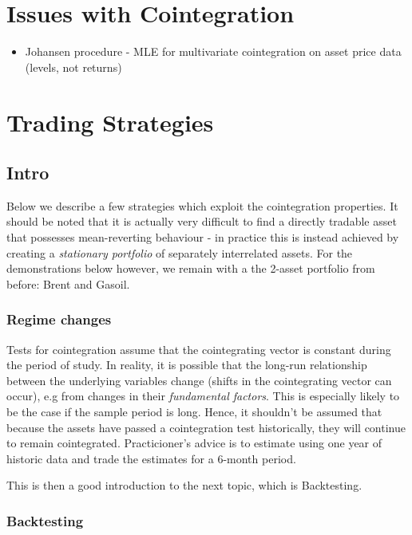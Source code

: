 \documentclass{article}
\providecommand{\tightlist}{%
      \setlength{\itemsep}{0pt}\setlength{\parskip}{0pt}}
\begin{document}
    \section{Issues with Cointegration}\label{issues-with-cointegration}

\begin{itemize}
\tightlist
\item
  Johansen procedure - MLE for multivariate cointegration on asset price
  data (levels, not returns)
\end{itemize}

    \section{Trading Strategies}\label{trading-strategies}

    \subsection{Intro}\label{intro}

Below we describe a few strategies which exploit the cointegration
properties. It should be noted that it is actually very difficult to
find a directly tradable asset that possesses mean-reverting behaviour -
in practice this is instead achieved by creating a \emph{stationary
portfolio} of separately interrelated assets. For the demonstrations
below however, we remain with a the 2-asset portfolio from before: Brent
and Gasoil.

    \subsubsection{Regime changes}\label{regime-changes}

Tests for cointegration assume that the cointegrating vector is constant
during the period of study. In reality, it is possible that the long-run
relationship between the underlying variables change (shifts in the
cointegrating vector can occur), e.g from changes in their
\emph{fundamental factors}. This is especially likely to be the case if
the sample period is long. Hence, it shouldn't be assumed that because
the assets have passed a cointegration test historically, they will
continue to remain cointegrated. Practicioner's advice is to estimate
using one year of historic data and trade the estimates for a 6-month
period.

This is then a good introduction to the next topic, which is
Backtesting.

    \subsubsection{Backtesting}\label{backtesting}
\end{document}
